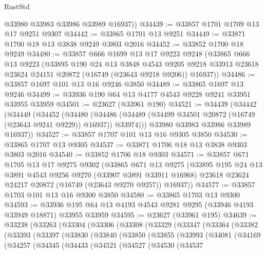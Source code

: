\begin{lexlean}{RustStd}
\begin{coremodule}
        @33980
        @33983
        @33986
        @33989
        @16937))
@34439 := @33857 @1701 @1709 @13 @17 @9251 @9307
@34442 := @33865 @1701 @13 @9251
@34449 := @33871 @1700 @18 @13 @3838 @9249 @3803 @2016
@34452 := @33852 @1700 @18 @9249
@34480 := @33857
    @666
    @1699
    @13
    @17
    @9223
    @9248
    (@33865
      @666
      @13
      @9223
      (@33895
        @190
        @24
        @13
        @3848
        @4543
        @9205
        @9218
        @33913
        @23618
        @23624
        @24151
        @20872
        (@16749 (@23643 @9218 @9206))
        @16937))
@34486 := @33857 @1697 @101 @13 @16 @9246 @3850
@34489 := @33865 @1697 @13 @9246
@34499 := @33936 @190 @64 @13 @4177 @4543 @9228 @9241 @33951 @33955 @33959
@34501 := @23627 (@33961 @190)
@34521 := @34439
    (@34442
      (@34449
        (@34452
          (@34480
            (@34486 (@34489 (@34499 @34501 @20872 (@16749 (@23643 @9241 @9229)) @16937)) @33974)))
        @33980
        @33983
        @33986
        @33989
        @16937))
@34527 := @33857 @1707 @101 @13 @16 @9305 @3850
@34530 := @33865 @1707 @13 @9305
@34537 := @33871 @1706 @18 @13 @3838 @9303 @3803 @2016
@34540 := @33852 @1706 @18 @9303
@34571 := @33857
    @671
    @1705
    @13
    @17
    @9275
    @9302
    (@33865
      @671
      @13
      @9275
      (@33895
        @195
        @24
        @13
        @3891
        @4543
        @9256
        @9270
        (@33907 @3891 @33911 @16968)
        @23618
        @23624
        @24217
        @20872
        (@16749 (@23643 @9270 @9257))
        @16937))
@34577 := @33857 @1703 @101 @13 @16 @9300 @3850
@34580 := @33865 @1703 @13 @9300
@34593 := @33936 @195 @64 @13 @4193 @4543 @9281 @9295 (@33946 @4193 @33949 @18871) @33955 @33959
@34595 := @23627 (@33961 @195)
@34639 := @33238
    (@33263
      (@33304
        (@33306
          (@33308
            (@33329
              (@33347
                (@33364
                  (@33382
                    (@33393
                      (@33397
                        (@33830
                          (@33840
                            (@33850
                              (@33855
                                (@33993
                                  (@34081
                                    (@34169
                                      (@34257
                                        (@34345
                                          (@34433
                                            (@34521
                                              (@34527
                                                (@34530
                                                  (@34537

\end{coremodule}
\end{lexlean}
